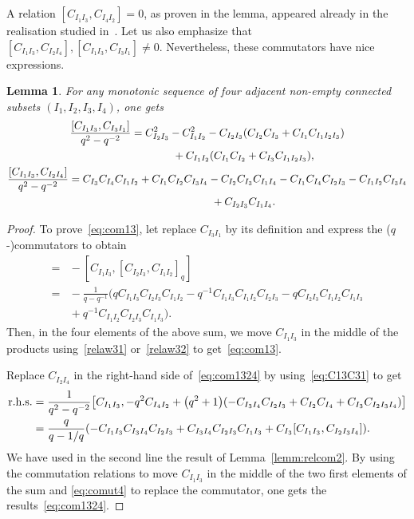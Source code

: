 \documentclass[10pt,a4paper]{amsart}
\numberwithin{equation}{section}
\newtheorem{lemm}[theo]{Lemma}
\theoremstyle{definition}
\begin{document}
A relation $[C_{I_1I_3}, C_{I_4I_2} ]=0$, as proven in the lemma, appeared already in the realisation studied in~\cite{PostWalt}.
Let us also emphasize that $[C_{I_1I_3}, C_{I_2I_4} ], [C_{I_1I_3}, C_{I_3I_1} ]\neq 0$. Nevertheless, these commutators have nice expressions.
\begin{lemm}\label{lem:ff}For any monotonic sequence of four adjacent non-empty connected subsets $(I_1,I_2,\allowbreak I_3,I_4)$, one gets
\begin{gather}
\frac{[C_{I_1I_3}, C_{I_3I_1} ]}{q^2-q^{-2}}= C_{I_2I_3}^2 -C_{I_1I_2}^2 - C_{I_2I_3}(C_{I_2}C_{I_3}+C_{I_1}C_{I_1I_2I_3}) \nonumber\\
\hphantom{\frac{[C_{I_1I_3}, C_{I_3I_1} ]}{q^2-q^{-2}}=}{}+ C_{I_1I_2}(C_{I_1}C_{I_2}+C_{I_3}C_{I_1I_2I_3} ) ,\label{eq:com13} \\
 \frac{[C_{I_1I_3}, C_{I_2I_4} ]}{q^2-q^{-2}}= C_{I_3} C_{I_4}C_{I_{1}I_2}+C_{I_1} C_{I_2}C_{I_3I_4}-C_{I_2} C_{I_3}C_{I_1I_4}-C_{I_1} C_{I_4}C_{I_2I_3} -C_{I_1I_2}C_{I_3I_4}\nonumber\\
\hphantom{\frac{[C_{I_1I_3}, C_{I_2I_4} ]}{q^2-q^{-2}}=}{}+C_{I_2I_3}C_{I_1I_4}.\label{eq:com1324}
 \end{gather}
\end{lemm}
\begin{proof} To prove~\eqref{eq:com13}, let replace $C_{I_3I_1}$ by its definition and express the ($q$-)commutators to obtain
\begin{align*}
[C_{I_1I_3}, C_{I_3I_1} ]={}&{}-[C_{I_1I_3}, [C_{I_2I_3},C_{I_1I_2}]_q ]\\
={}&{}-\frac{1}{q-q^{-1}}\big(qC_{I_1I_3}C_{I_2I_3}C_{I_1I_2}-q^{-1}C_{I_1I_3}C_{I_1I_2}C_{I_2I_3}-qC_{I_2I_3}C_{I_1I_2}C_{I_1I_3}\\
&{}+q^{-1}C_{I_1I_2}C_{I_2I_3}C_{I_1I_3}\big).
\end{align*}
Then, in the four elements of the above sum, we move $C_{I_1I_3}$ in the middle of the products using~\eqref{relaw31}
or~\eqref{relaw32} to get~\eqref{eq:com13}.

Replace $C_{I_2I_4}$ in the right-hand side of~\eqref{eq:com1324} by using~\eqref{eq:C13C31} to get
\begin{align*}
 {\rm r.h.s.}&=\frac{1}{q^2-q^{-2}} \big[C_{I_1I_3}, -q^2C_{I_4I_2}+\big(q^2+1\big)(-C_{I_3I_4}C_{I_2I_3}+C_{I_2}C_{I_4}+C_{I_3}C_{I_2I_3I_4}) \big]\\
 &=\frac{q}{q-1/q} ( -C_{I_1I_3}C_{I_3I_4}C_{I_2I_3}+C_{I_3I_4}C_{I_2I_3}C_{I_1I_3}+C_{I_3}[C_{I_1I_3},C_{I_2I_3I_4} ] ).
\end{align*}
We have used in the second line the result of Lemma~\ref{lemm:relcom2}. By using the commutation relations to move $C_{I_1I_3}$ in the middle of the two first elements of the sum and
\eqref{eq:comut4} to replace the commutator, one gets the results~\eqref{eq:com1324}.
\end{proof}
\end{document}
